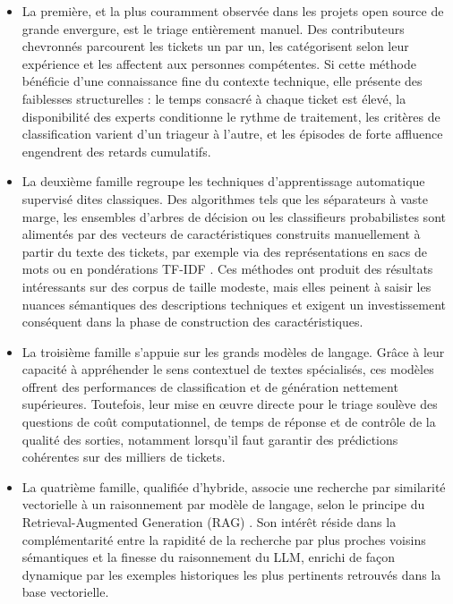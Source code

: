 \begin{itemize}
    \item La première, et la plus couramment observée dans les projets open source de grande envergure, est le triage entièrement manuel. Des contributeurs chevronnés parcourent les tickets un par un, les catégorisent selon leur expérience et les affectent aux personnes compétentes. Si cette méthode bénéficie d'une connaissance fine du contexte technique, elle présente des faiblesses structurelles : le temps consacré à chaque ticket est élevé, la disponibilité des experts conditionne le rythme de traitement, les critères de classification varient d'un triageur à l'autre, et les épisodes de forte affluence engendrent des retards cumulatifs.
    \item La deuxième famille regroupe les techniques d'apprentissage automatique supervisé dites classiques. Des algorithmes tels que les séparateurs à vaste marge, les ensembles d'arbres de décision ou les classifieurs probabilistes sont alimentés par des vecteurs de caractéristiques construits manuellement à partir du texte des tickets, par exemple via des représentations en sacs de mots ou en pondérations TF-IDF \cite{logo:tfidf}. Ces méthodes ont produit des résultats intéressants sur des corpus de taille modeste, mais elles peinent à saisir les nuances sémantiques des descriptions techniques et exigent un investissement conséquent dans la phase de construction des caractéristiques.
    \item La troisième famille s'appuie sur les grands modèles de langage. Grâce à leur capacité à appréhender le sens contextuel de textes spécialisés, ces modèles offrent des performances de classification et de génération nettement supérieures. Toutefois, leur mise en œuvre directe pour le triage soulève des questions de coût computationnel, de temps de réponse et de contrôle de la qualité des sorties, notamment lorsqu'il faut garantir des prédictions cohérentes sur des milliers de tickets.
    \item La quatrième famille, qualifiée d'hybride, associe une recherche par similarité vectorielle à un raisonnement par modèle de langage, selon le principe du Retrieval-Augmented Generation (RAG) \cite{logo:rag}. Son intérêt réside dans la complémentarité entre la rapidité de la recherche par plus proches voisins sémantiques et la finesse du raisonnement du LLM, enrichi de façon dynamique par les exemples historiques les plus pertinents retrouvés dans la base vectorielle.
\end{itemize}

